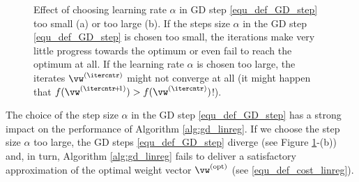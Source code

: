 \documentclass[12pt]{report}
\begin{document}
\begin{figure}[hbtp]
\begin{center}
\begin{minipage}{0.45\columnwidth}
\end{minipage}
\begin{minipage}{0.45\columnwidth}
\end{minipage}
\end{center}
\caption{Effect of choosing learning rate $\alpha$ in GD step 
	\eqref{equ_def_GD_step} too small (a) or too large (b). If the 
	steps size $\alpha$ in the GD step \eqref{equ_def_GD_step} is 
	chosen too small, the iterations make very little progress 
	towards the optimum or even fail to reach the optimum at all. 
	If the learning rate $\alpha$ is chosen too large, the iterates $\vw^{(\itercntr)}$ 
    might not converge at all (it might happen that $f(\vw^{(\itercntr\!+\!1)}) > f(\vw^{(\itercntr)})$!). }
\label{fig_small_large_alpha}
\end{figure}

The choice of the step size $\alpha$ in the GD step \eqref{equ_def_GD_step} 
has a strong impact on the performance of Algorithm \ref{alg:gd_linreg}. If we 
choose the step size $\alpha$ too large, the GD steps \eqref{equ_def_GD_step} 
diverge (see Figure \ref{fig_small_large_alpha}-(b)) and, in turn, 
Algorithm \ref{alg:gd_linreg} fails to deliver a satisfactory approximation of 
the optimal weight vector $\vw^{(\rm opt)}$ (see \eqref{equ_def_cost_linreg}). 
\end{document}

